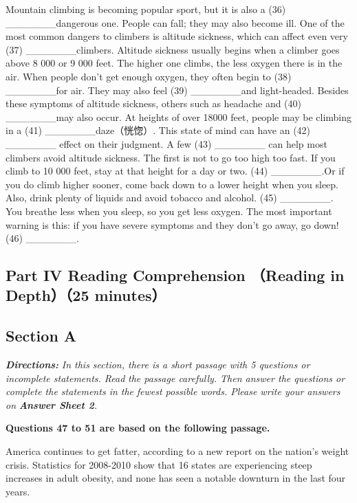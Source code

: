 \documentclass[UTF8,11pt]{ctexart}
\begin{document}
Mountain climbing is becoming popular sport, but it is also a (36) \_\_\_\_\_\_\_dangerous one. People can fall; they may also become ill. One of the most common dangers to climbers is altitude sickness, which can affect even very (37) \_\_\_\_\_\_\_climbers. Altitude sickness usually begins when a climber goes above 8 000 or 9 000 feet. The higher one climbs, the less oxygen there is in the air. When people don't get enough oxygen, they often begin to (38) \_\_\_\_\_\_\_for air. They may also feel (39) \_\_\_\_\_\_\_and light-headed. Besides these symptoms of altitude sickness, others such as headache and (40) \_\_\_\_\_\_\_may also occur. At heights of over 18000 feet, people may be climbing in a (41) \_\_\_\_\_\_\_daze（恍惚）. This state of mind can have an (42) \_\_\_\_\_\_\_ effect on their judgment. A few (43) \_\_\_\_\_\_\_ can help most climbers avoid altitude sickness. The first is not to go too high too fast. If you climb to 10 000 feet, stay at that height for a day or two. (44) \_\_\_\_\_\_\_.Or if you do climb higher sooner, come back down to a lower height when you sleep. Also, drink plenty of liquids and avoid tobacco and alcohol. (45) \_\_\_\_\_\_\_. You breathe less when you sleep, so you get less oxygen. The most important warning is this: if you have severe symptoms and they don't go away, go down! (46) \_\_\_\_\_\_\_.


\subsection*{\textbf{Part} IV \textbf{Reading Comprehension} （\textbf{Reading in Depth}）（\textbf{25 minutes}）}


\subsection*{\textbf{Section A}}


\textbf{\textit{Directions:}}\textit{ In this section, there is a short passage with 5 questions or incomplete statements. Read} \textit{the passage carefully. Then answer the questions or complete the statements in the} \textit{fewest possible words. Please write your answers on}\textbf{\textit{ Answer Sheet 2}}\textit{.}


\textbf{Questions 47 to 51 are based on the following passage.}


America continues to get fatter, according to a new report on the nation's weight crisis. Statistics for 2008-2010 show that 16 states are experiencing steep increases in adult obesity, and none has seen a notable downturn in the last four years.
\end{document}
